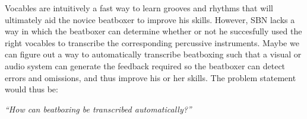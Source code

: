 Vocables are intuitively a fast way to learn grooves and rhythms that will ultimately aid the novice beatboxer to improve his skills. However, SBN lacks a way in which the beatboxer can determine whether or not he succesfully used the right vocables to transcribe the corresponding percussive instruments. Maybe we can figure out a way to automatically transcribe beatboxing such that a visual or audio system can  generate  the feedback required so the beatboxer can detect errors and omissions, and thus improve his or her skills. The problem statement would thus be:\\
\begin{center}
\textit{“How can beatboxing be transcribed automatically?”}
\end{center}
